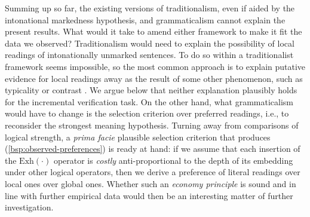 \documentclass[fleqn,reqno,10pt,draft]{article}
\newcommand{\exh}{\ensuremath{\mathrm{Exh}}}
\begin{document}
Summing up so far, the existing versions of traditionalism, even if
aided by the intonational markedness hypothesis, and grammaticalism
cannot explain the present results. What would it take to amend either
framework to make it fit the data we observed? Traditionalism would
need to explain the possibility of local readings of intonationally
unmarked sentences. To do so within a traditionalist framework seems
impossible, so the most common approach is to explain putative
evidence for local readings away as the result of some other
phenomenon, such as typicality or contrast
\citep{Tielvan-Tiel2012:Embedded-Scalar,GeurtsTielvan-Tiel2013:Scalar-expressi}. We
argue below that neither explanation plausibly holds for the
incremental verification task. On the other hand, what grammaticalism
would have to change is the selection criterion over preferred
readings, i.e., to reconsider the strongest meaning
hypothesis. Turning away from comparisons of logical strength, a
\emph{prima facie} plausible selection criterion that produces
(\ref{bsp:observed-preferences}) is ready at hand: if we assume that
each insertion of the $\exh(\cdot)$ operator is \emph{costly}
anti-proportional to the depth of its embedding under other logical
operators, then we derive a preference of literal readings over local
ones over global ones. Whether such an \emph{economy principle} is
sound and in line with further empirical data would then be an
interesting matter of further investigation.
\end{document}
